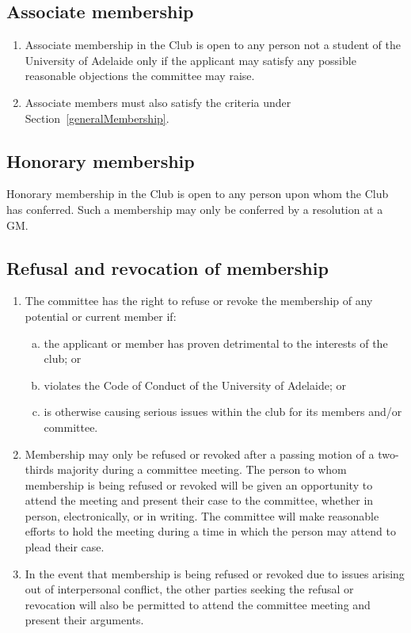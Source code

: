 \documentclass{constitution}
\begin{document}
\subsection{Associate membership}\label{associateMembership}
\begin{enumerate}[(1)]
    \item Associate membership in the Club is open to any person not a student of the University of Adelaide only if the applicant may satisfy any possible reasonable objections the committee may raise.
    \item Associate members must also satisfy the criteria under Section~\ref{generalMembership}. %
\end{enumerate}

\subsection{Honorary membership}\label{honoraryMembership}
Honorary membership in the Club is open to any person upon whom the Club has conferred. Such a membership may only be conferred by a resolution at a GM.

\subsection{Refusal and revocation of membership}\label{refusalRevocationMembership}
\begin{enumerate}[(1)]
    \item The committee has the right to refuse or revoke the membership of any potential or current member if:
          \begin{enumerate}[(a)]
              \item the applicant or member has proven detrimental to the interests of the club; or
              \item violates the Code of Conduct of the University of Adelaide; or
              \item is otherwise causing serious issues within the club for its members and/or committee.
          \end{enumerate}
    \item Membership may only be refused or revoked after a passing motion of a two-thirds majority during a committee meeting. The person to whom membership is being refused or revoked will be given an opportunity to attend the meeting and present their case to the committee, whether in person, electronically, or in writing. The committee will make reasonable efforts to hold the meeting during a time in which the person may attend to plead their case.
    \item In the event that membership is being refused or revoked due to issues arising out of interpersonal conflict, the other parties seeking the refusal or revocation will also be permitted to attend the committee meeting and present their arguments.
\end{enumerate}
\end{document}
